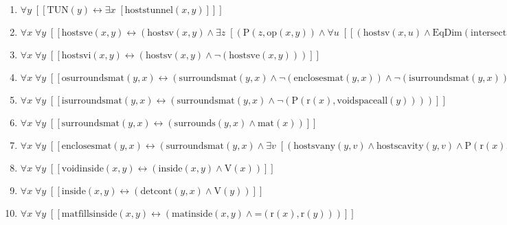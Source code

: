 \documentclass{article}
\begin{document}
\begin{enumerate}
\item $\forall y\;  \left[ \left[ \textrm{TUN}(y) \leftrightarrow \exists x\;  \left[ \textrm{hoststunnel}(x,y) \right] \right] \right]$
\item $\forall x\; \forall y\;  \left[ \left[ \textrm{hostsve}(x,y) \leftrightarrow \left(\textrm{hostsv}(x,y) \land \exists z\;  \left[ \left(\textrm{P}(z,\textrm{op}(x,y)) \land \forall u\;  \left[ \left[ \left(\textrm{hostsv}(x,u) \land \textrm{EqDim}(\textrm{intersection}(z,\textrm{r}(u)),z)\right) \rightarrow \left(\textrm{PO}(\textrm{r}(y),\textrm{r}(u)) \land \textrm{Cont}(\textrm{intersection}(z,\textrm{r}(u)),\textrm{op}(x,u))\right) \right] \right]\right) \right]\right) \right] \right]$
\item $\forall x\; \forall y\;  \left[ \left[ \textrm{hostsvi}(x,y) \leftrightarrow \left(\textrm{hostsv}(x,y) \land \neg \left(\textrm{hostsve}(x,y)\right)\right) \right] \right]$
\item $\forall x\; \forall y\;  \left[ \left[ \textrm{osurroundsmat}(y,x) \leftrightarrow \left(\textrm{surroundsmat}(y,x) \land \neg \left(\textrm{enclosesmat}(y,x)\right) \land \neg \left(\textrm{isurroundsmat}(y,x)\right)\right) \right] \right]$
\item $\forall x\; \forall y\;  \left[ \left[ \textrm{isurroundsmat}(y,x) \leftrightarrow \left(\textrm{surroundsmat}(y,x) \land \neg \left(\textrm{P}(\textrm{r}(x),\textrm{voidspaceall}(y))\right)\right) \right] \right]$
\item $\forall x\; \forall y\;  \left[ \left[ \textrm{surroundsmat}(y,x) \leftrightarrow \left(\textrm{surrounds}(y,x) \land \textrm{mat}(x)\right) \right] \right]$
\item $\forall x\; \forall y\;  \left[ \left[ \textrm{enclosesmat}(y,x) \leftrightarrow \left(\textrm{surroundsmat}(y,x) \land \exists v\;  \left[ \left(\textrm{hostsvany}(y,v) \land \textrm{hostscavity}(y,v) \land \textrm{P}(\textrm{r}(x),\textrm{r}(y))\right) \right]\right) \right] \right]$
\item $\forall x\; \forall y\;  \left[ \left[ \textrm{voidinside}(x,y) \leftrightarrow \left(\textrm{inside}(x,y) \land \textrm{V}(x)\right) \right] \right]$
\item $\forall x\; \forall y\;  \left[ \left[ \textrm{inside}(x,y) \leftrightarrow \left(\textrm{detcont}(y,x) \land \textrm{V}(y)\right) \right] \right]$
\item $\forall x\; \forall y\;  \left[ \left[ \textrm{matfillsinside}(x,y) \leftrightarrow \left(\textrm{matinside}(x,y) \land \textrm{=}(\textrm{r}(x),\textrm{r}(y))\right) \right] \right]$

\end{enumerate}
\end{document}

